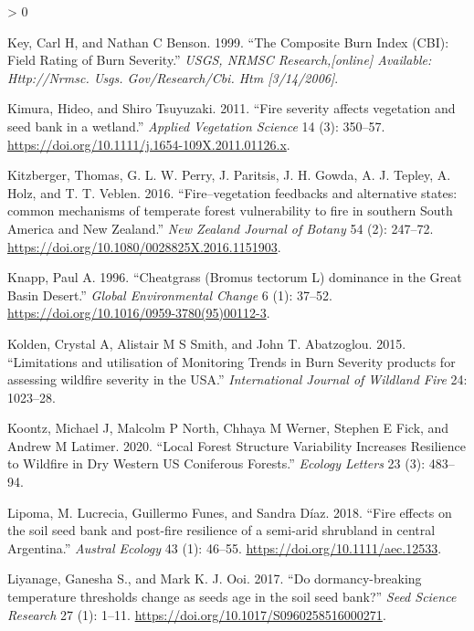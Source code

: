 \documentclass[
  12pt,
]{article}
\newlength{\cslhangindent}
\newenvironment{CSLReferences}[2] %
 {%
  \setlength{\parindent}{0pt}
  \ifodd #1 \everypar{\setlength{\hangindent}{\cslhangindent}}\ignorespaces\fi
  \ifnum #2 > 0
  \setlength{\parskip}{#2\baselineskip}
  \fi
 }%
 {}
\begin{document}
\begin{CSLReferences}{1}{0}
\leavevmode\hypertarget{ref-Key1999}{}%
Key, Carl H, and Nathan C Benson. 1999. {``The Composite Burn Index
(CBI): Field Rating of Burn Severity.''} \emph{USGS, NRMSC
Research,{[}online{]} Available: Http://Nrmsc. Usgs. Gov/Research/Cbi.
Htm {[}3/14/2006{]}}.

\leavevmode\hypertarget{ref-Kimura2011}{}%
Kimura, Hideo, and Shiro Tsuyuzaki. 2011. {``{Fire severity affects
vegetation and seed bank in a wetland}.''} \emph{Applied Vegetation
Science} 14 (3): 350--57.
\url{https://doi.org/10.1111/j.1654-109X.2011.01126.x}.

\leavevmode\hypertarget{ref-Kitzberger2016}{}%
Kitzberger, Thomas, G. L. W. Perry, J. Paritsis, J. H. Gowda, A. J.
Tepley, A. Holz, and T. T. Veblen. 2016. {``{Fire--vegetation feedbacks
and alternative states: common mechanisms of temperate forest
vulnerability to fire in southern South America and New Zealand}.''}
\emph{New Zealand Journal of Botany} 54 (2): 247--72.
\url{https://doi.org/10.1080/0028825X.2016.1151903}.

\leavevmode\hypertarget{ref-Knapp1996}{}%
Knapp, Paul A. 1996. {``{Cheatgrass (Bromus tectorum L) dominance in the
Great Basin Desert}.''} \emph{Global Environmental Change} 6 (1):
37--52. \url{https://doi.org/10.1016/0959-3780(95)00112-3}.

\leavevmode\hypertarget{ref-Kolden2015}{}%
Kolden, Crystal A, Alistair M S Smith, and John T. Abatzoglou. 2015.
{``{Limitations and utilisation of Monitoring Trends in Burn Severity
products for assessing wildfire severity in the USA}.''}
\emph{International Journal of Wildland Fire} 24: 1023--28.

\leavevmode\hypertarget{ref-Koontz2020}{}%
Koontz, Michael J, Malcolm P North, Chhaya M Werner, Stephen E Fick, and
Andrew M Latimer. 2020. {``Local Forest Structure Variability Increases
Resilience to Wildfire in Dry Western US Coniferous Forests.''}
\emph{Ecology Letters} 23 (3): 483--94.

\leavevmode\hypertarget{ref-Lipoma2018}{}%
Lipoma, M. Lucrecia, Guillermo Funes, and Sandra Díaz. 2018. {``{Fire
effects on the soil seed bank and post-fire resilience of a semi-arid
shrubland in central Argentina}.''} \emph{Austral Ecology} 43 (1):
46--55. \url{https://doi.org/10.1111/aec.12533}.

\leavevmode\hypertarget{ref-Liyanage2017}{}%
Liyanage, Ganesha S., and Mark K. J. Ooi. 2017. {``{Do dormancy-breaking
temperature thresholds change as seeds age in the soil seed bank?}''}
\emph{Seed Science Research} 27 (1): 1--11.
\url{https://doi.org/10.1017/S0960258516000271}.


\end{CSLReferences}
\end{document}
